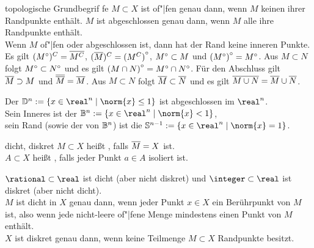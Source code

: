 \begin{Satz}{topologische Grundbegrif \!\!fe}
    $M \subset X$ ist of"|fen genau dann, wenn $M$ keinen ihrer Randpunkte
    enthält.
    $M$ ist abgeschlossen genau dann, wenn $M$ alle ihre Randpunkte enthält. \\
    Wenn $M$ of"|fen oder abgeschlossen ist, dann hat der Rand keine inneren
    Punkte. \\
    Es gilt $({M}^\circ)^C = \overline{M^C}$,
    $(\overline{M})^C = {(M^C)}^\circ$,
    ${M}^\circ \subset M$ und ${({M}^\circ)}^\circ = {M}^\circ$.
    Aus $M \subset N$ folgt ${M}^\circ \subset {N}^\circ$ und es gilt
    ${(M \cap N)}^\circ = {M}^\circ \cap {N}^\circ$.
    Für den Abschluss gilt $\overline{M} \supset M$ und
    $\overline{\overline{M}} = \overline{M}$.
    Aus $M \subset N$ folgt $\overline{M} \subset \overline{N}$ und es gilt
    $\overline{M \cup N} = \overline{M} \cup \overline{N}$.
\end{Satz}

\begin{Bsp}
    Der 
    $\dball^n := \{x \in \real^n \;|\; \norm{x} \le 1\}$
    ist abgeschlossen im $\real^n$. \\
    Sein Inneres ist der 
    $\ball^n := \{x \in \real^n \;|\; \norm{x} < 1\}$, \\
    sein Rand (sowie der von $\mathbb{B}^n$) ist die 
    $\sphere^{n-1} := \{x \in \real^n \;|\; \norm{x} = 1\}$.
\end{Bsp}

\linie

\begin{Def}{dicht, diskret}
    $M \subset X$ heißt , falls $\overline{M} = X$ ist.
    \\
    $A \subset X$ heißt , falls jeder Punkt $a \in A$ isoliert
    ist.
\end{Def}

\begin{Bsp}
    $\rational \subset \real$ ist dicht (aber nicht diskret) und
    $\integer \subset \real$ ist diskret (aber nicht dicht). \\
    $M$ ist dicht in $X$ genau dann, wenn jeder Punkt $x \in X$ ein Berührpunkt
    von $M$ ist, also wenn jede nicht-leere of"|fene Menge mindestens
    einen Punkt von $M$ enthält. \\
    $X$ ist diskret genau dann, wenn keine Teilmenge $M \subset X$ Randpunkte
    besitzt.
\end{Bsp}


